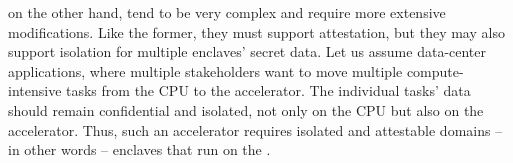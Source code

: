  on the other hand, tend to be very complex and require more extensive modifications. Like the former, they must support attestation, but they may also support isolation for multiple enclaves' secret data. Let us assume data-center applications, where multiple stakeholders want to move multiple compute-intensive tasks from the CPU to the accelerator. The individual tasks' data should remain confidential and isolated, not only on the CPU but also on the accelerator. Thus, such an accelerator requires isolated and attestable domains -- in other words -- enclaves that run on the \sphw. 





